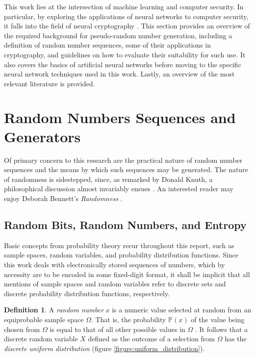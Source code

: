 \documentclass[12pt, titlepage]{report}
\theoremstyle{definition}
\newtheorem{definition}{Definition}
\begin{document}
This work lies at the intersection of machine learning and computer security. In particular, by exploring the applications of neural networks to computer security, it falls into the field of neural cryptography \cite{klimov2002analysis}. This section provides an overview of the required background for pseudo-random number generation, including a definition of random number sequences, some of their applications in cryptography, and guidelines on how to evaluate their suitability for such use. It also covers the basics of artificial neural networks before moving to the specific neural network techniques used in this work. Lastly, an overview of the most relevant literature is provided.

\section{Random Numbers Sequences and Generators}
Of primary concern to this research are the practical nature of random number sequences and the means by which such sequences may be generated. The nature of randomness is sidestepped, since, as remarked by Donald Knuth, a philosophical discussion almost invariably ensues \cite[p. 2]{donald1998art}. An interested reader may enjoy Deborah Bennett's \textit{Randomness} \cite{bennett2009randomness}.

\subsection{Random Bits, Random Numbers, and Entropy}
Basic concepts from probability theory recur throughout this report, such as sample spaces, random variables, and probability distribution functions. Since this work deals with electronically stored sequences of numbers, which by necessity are to be encoded in some fixed-digit format, it shall be implicit that all mentions of sample spaces and random variables refer to discrete sets and discrete probability distribution functions, respectively.

\begin{definition}
A \emph{random number} $x$ is a numeric value selected at random from an equiprobable sample space $\Omega$. That is, the probability $\mathbb{P}(x)$ of the value being chosen from $\Omega$ is equal to that of all other possible values in $\Omega$ \cite[p. 7]{barker2007recommendation} \cite[s. 1.1.1]{rukhin2001statistical}. It follows that a discrete random variable $X$ defined as the outcome of a selection from $\Omega$ has the \emph{discrete uniform distribution} (figure \ref{figure:uniform_distribution}).
\end{definition}
\end{document}
